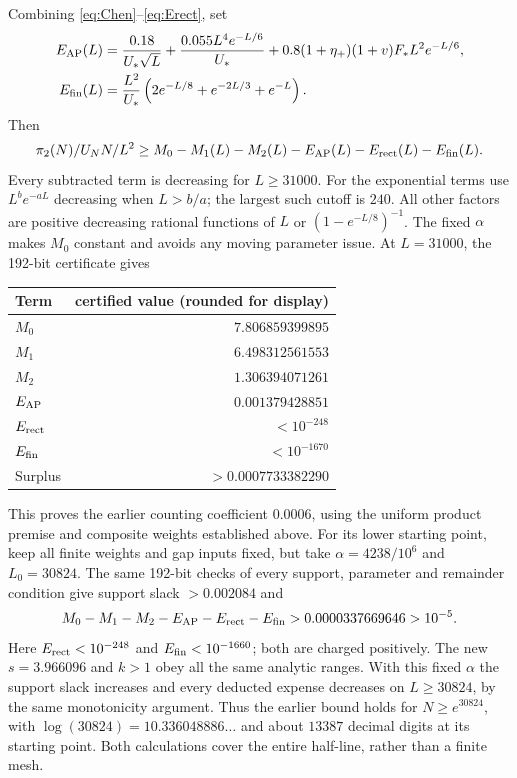 \documentclass[11pt]{article}
\newcommand{\Th}{U_NN/L^2}
\begin{document}
Combining \eqref{eq:Chen}--\eqref{eq:Erect}, set
\begin{align*}
E_{\rm AP}(L)&=\frac{0.18}{U_*\sqrt L}
+\frac{0.055L^4e^{-L/6}}{U_*}
+0.8(1+\eta_+)(1+v)F_*L^2e^{-L/6},\\
E_{\rm fin}(L)&=\frac{L^2}{U_*}
\left(2e^{-L/8}+e^{-2L/3}+e^{-L}\right).
\end{align*}
Then
\[
\pi_2(N)/\Th\ge
M_0-M_1(L)-M_2(L)-E_{\rm AP}(L)-E_{\rm rect}(L)-E_{\rm fin}(L).
\]
Every subtracted term is decreasing for $L\ge31000$.
For the exponential terms use $L^be^{-aL}$ decreasing when $L>b/a$;
the largest such cutoff is $240$. All other factors are positive
decreasing rational functions of $L$ or $(1-e^{-L/8})^{-1}$.
The fixed $\alpha$ makes $M_0$ constant and avoids any moving
parameter issue. At $L=31000$, the 192-bit certificate gives
\begin{center}
\begin{tabular}{lr}\toprule
Term & certified value (rounded for display)\\\midrule
$M_0$ & $7.806859399895$\\
$M_1$ & $6.498312561553$\\
$M_2$ & $1.306394071261$\\
$E_{\rm AP}$ & $0.001379428851$\\
$E_{\rm rect}$ & $<10^{-248}$\\
$E_{\rm fin}$ & $<10^{-1670}$\\\midrule
Surplus & $>0.0007733382290$\\\bottomrule
\end{tabular}
\end{center}
This proves the earlier counting coefficient $0.0006$,
using the uniform product premise and composite weights established above.
For its lower starting point, keep all finite weights and gap inputs fixed,
but take $\alpha=4238/10^6$ and $L_0=30824$.
The same 192-bit checks of every support, parameter and remainder
condition give support slack $>0.002084$ and
\[
M_0-M_1-M_2-E_{\rm AP}-E_{\rm rect}-E_{\rm fin}
>0.0000337669646>10^{-5}.
\]
Here $E_{\rm rect}<10^{-248}$ and $E_{\rm fin}<10^{-1660}$;
both are charged positively. The new $s=3.966096$ and $k>1$ obey
all the same analytic ranges. With this fixed $\alpha$ the support slack
increases and every deducted expense decreases on $L\ge30824$,
by the same monotonicity argument. Thus the earlier bound holds for
$N\ge e^{30824}$, with $\log(30824)=10.336048886\ldots$ and about
$13387$ decimal digits at its starting point.
Both calculations cover the entire half-line, rather than a finite mesh.
\end{document}
